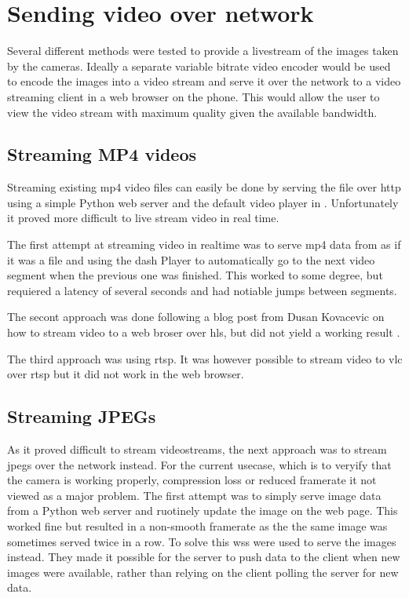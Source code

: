 
\section{Sending video over network}
Several different methods were tested to provide a livestream of the images taken by the cameras.
Ideally a separate variable bitrate video encoder would be used to encode the images into a video stream and serve it over the network to a video streaming client in a web browser on the phone.
This would allow the user to view the video stream with maximum quality given the available bandwidth.

\subsection{Streaming MP4 videos}
Streaming existing \gls{mp4} video files can easily be done by serving the file over \gls{http} using a simple Python web server and the default video player in \chrome.
Unfortunately it proved more difficult to live stream video in real time.

The first attempt at streaming video in realtime was to serve \gls{mp4} data from \gs as if it was a file and using the \gls{dash} Player to automatically go to the next video segment when the previous one was finished.
This worked to some degree, but requiered a latency of several seconds and had notiable jumps between segments.

The secont approach was done following a blog post from Dusan Kovacevic on how to stream video to a web broser over \gls{hls}, but did not yield a working result \cite{kovacevicStreamLiveVideo2020}.

The third approach was using \gls{rtsp}.
It was however possible to stream video to \gls{vlc} over \gls{rtsp} but it did not work in the web browser.

\subsection{Streaming JPEGs}
As it proved difficult to stream videostreams, the next approach was to stream \glspl{jpeg} over the network instead.
For the current usecase, which is to veryify that the camera is working properly, compression loss or reduced framerate it not viewed as a major problem.
The first attempt was to simply serve image data from a Python web server and ruotinely update the image on the web page.
This worked fine but resulted in a non-smooth framerate as the the same image was sometimes served twice in a row.
To solve this \glspl{ws} were used to serve the images instead.
They made it possible for the server to push data to the client when new images were available, rather than relying on the client polling the server for new data.

